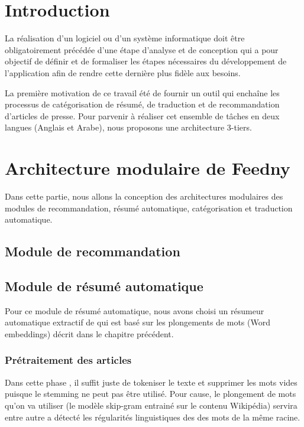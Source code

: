 
\newpage
\section{Introduction}
La réalisation d'un logiciel ou d'un système informatique doit être obligatoirement précédée d'une étape d'analyse et de conception qui a pour objectif de définir et de formaliser les étapes nécessaires du développement de l'application afin de rendre cette dernière plus fidèle aux besoins.

La première motivation de ce travail été de fournir un outil qui enchaîne les processus de catégorisation de résumé, de traduction et de recommandation d'articles de presse. Pour parvenir à réaliser cet ensemble de tâches en deux langues (Anglais et Arabe), nous proposons une architecture 3-tiers. 


\section{Architecture modulaire de \textquotedbl Feedny\textquotedbl}
Dans cette partie, nous allons la conception des architectures modulaires des modules de recommandation, résumé automatique, catégorisation et traduction automatique.

\subsection{Module de recommandation}


\subsection{Module de résumé automatique}

Pour ce module de résumé automatique, nous avons choisi un résumeur automatique extractif de \cite{notreresume} qui est basé sur les plongements de mots (Word embeddings) décrit dans le chapitre précédent.

\subsubsection{Prétraitement des articles}
Dans cette phase , il suffit juste de tokeniser le texte et supprimer les mots vides puisque le stemming ne peut pas être utilisé. Pour cause, le plongement de mots qu'on va utiliser (le modèle skip-gram entrainé sur le contenu Wikipédia) servira entre autre a détecté les régularités linguistiques des des mots de la même racine.

